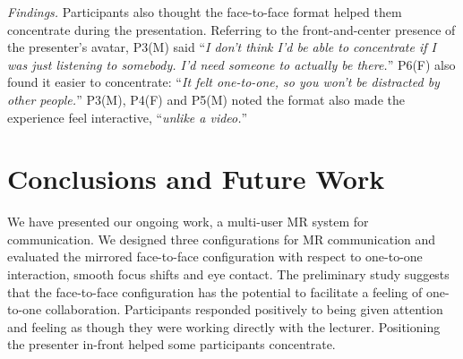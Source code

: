 \documentclass[sigchi-a]{acmart}
\begin{document}

\textit{Findings.}
Participants also thought the face-to-face format helped them concentrate during the presentation. Referring to the front-and-center presence of the presenter's avatar, P3(M) said ``\textit{I don't think I'd be able to concentrate if I was just listening to somebody. I'd need someone to actually be there.}'' P6(F) also found it easier to concentrate: ``\textit{It felt one-to-one, so you won't be distracted by other people.}'' P3(M), P4(F) and P5(M) noted the format also made the experience feel interactive, ``\textit{unlike a video.}''
\section{Conclusions and Future Work}

We have presented our ongoing work, a multi-user MR system for communication. We designed three configurations for MR communication and evaluated the mirrored face-to-face configuration with respect to one-to-one interaction, smooth focus shifts and eye contact.
The preliminary study suggests that the face-to-face configuration has the potential to facilitate a feeling of one-to-one collaboration. Participants responded positively to being given attention and feeling as though they were working directly with the lecturer. Positioning the presenter in-front helped some participants concentrate.%
\end{document}
